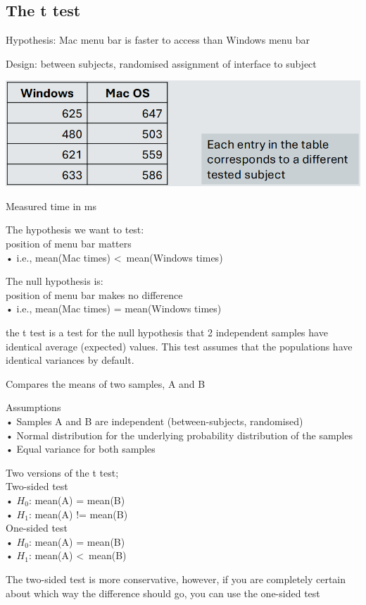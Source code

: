 \documentclass[]{project_plan}
\begin{document}
\subsection{The t test}

Hypothesis: Mac menu bar is faster to access than Windows menu bar

Design: between subjects, randomised assignment of interface to subject

\includegraphics[width=0.5\linewidth]{testing_menu_bars.png}

Measured time in ms

The hypothesis we want to test:\\
position of menu bar matters\\
• i.e., mean(Mac times) \textless \ mean(Windows times)

The null hypothesis is:\\
position of menu bar makes no difference\\
• i.e., mean(Mac times) = mean(Windows times)

the t test is a test for the null hypothesis that 2 independent samples have identical average
(expected) values. This test assumes that the populations have identical variances by
default.

Compares the means of two samples, A and B

Assumptions\\
• Samples A and B are independent (between-subjects, randomised)\\
• Normal distribution for the underlying probability distribution of the samples\\
• Equal variance for both samples

Two versions of the t test;\\
Two-sided test\\
• $H_0$: mean(A) = mean(B)\\
• $H_1$: mean(A) != mean(B)\\
One-sided test\\
• $H_0$: mean(A) = mean(B)\\
• $H_1$: mean(A) \textless \ mean(B)

The two-sided test is more conservative,
however, if you are completely certain about
which way the difference should go, you can use
the one-sided test
\end{document}
